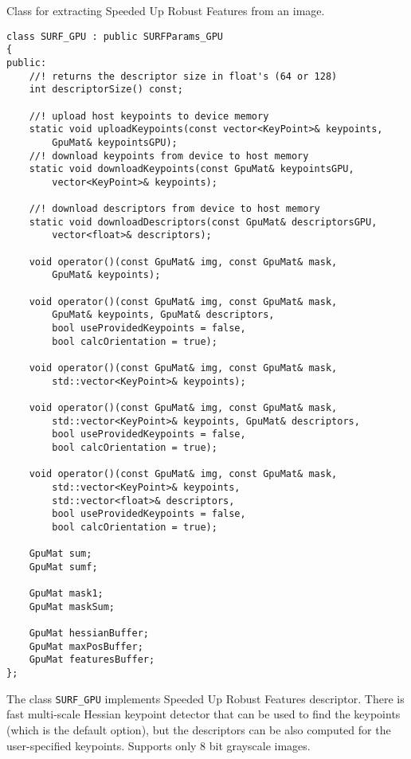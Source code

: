 Class for extracting Speeded Up Robust Features from an image.

\begin{lstlisting}
class SURF_GPU : public SURFParams_GPU
{
public:
    //! returns the descriptor size in float's (64 or 128)
    int descriptorSize() const;

    //! upload host keypoints to device memory
    static void uploadKeypoints(const vector<KeyPoint>& keypoints, 
        GpuMat& keypointsGPU);
    //! download keypoints from device to host memory
    static void downloadKeypoints(const GpuMat& keypointsGPU, 
        vector<KeyPoint>& keypoints);

    //! download descriptors from device to host memory
    static void downloadDescriptors(const GpuMat& descriptorsGPU, 
        vector<float>& descriptors);
    
    void operator()(const GpuMat& img, const GpuMat& mask, 
        GpuMat& keypoints);
    
    void operator()(const GpuMat& img, const GpuMat& mask, 
        GpuMat& keypoints, GpuMat& descriptors, 
        bool useProvidedKeypoints = false, 
        bool calcOrientation = true);

    void operator()(const GpuMat& img, const GpuMat& mask, 
        std::vector<KeyPoint>& keypoints);

    void operator()(const GpuMat& img, const GpuMat& mask, 
        std::vector<KeyPoint>& keypoints, GpuMat& descriptors, 
        bool useProvidedKeypoints = false, 
        bool calcOrientation = true);
    
    void operator()(const GpuMat& img, const GpuMat& mask, 
        std::vector<KeyPoint>& keypoints, 
        std::vector<float>& descriptors, 
        bool useProvidedKeypoints = false, 
        bool calcOrientation = true);

    GpuMat sum;
    GpuMat sumf;

    GpuMat mask1;
    GpuMat maskSum;

    GpuMat hessianBuffer;
    GpuMat maxPosBuffer;
    GpuMat featuresBuffer;
};
\end{lstlisting}

The class \texttt{SURF\_GPU} implements Speeded Up Robust Features descriptor. There is fast multi-scale Hessian keypoint detector that can be used to find the keypoints (which is the default option), but the descriptors can be also computed for the user-specified keypoints. Supports only 8 bit grayscale images.


